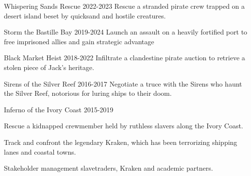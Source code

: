 \begin{cventries}
\cventry
{Whispering Sands Rescue} %
{}{}
{2022-2023} %
{ %
Rescue a stranded pirate crew trapped on a desert island beset by quicksand and hostile creatures.
}

\cventry
{Storm the Bastille Bay} %
{}{}
{2019-2024} %
{ %
Launch an assault on a heavily fortified port to free imprisoned allies and gain strategic advantage
}

\cventry
{Black Market Heist} %
{}{}
{2018-2022} %
{ %
Infiltrate a clandestine pirate auction to retrieve a stolen piece of Jack’s heritage.
}

\cventry
{Sirens of the Silver Reef} %
{}{}
{2016-2017} %
{ %
Negotiate a truce with the Sirens who haunt the Silver Reef, notorious for luring ships to their doom.
}

\cventry
{Inferno of the Ivory Coast} %
{}{}
{2015-2019} %
{ %
\begin{cvitems}
    \item {Rescue a kidnapped crewmember held by ruthless slavers along the Ivory Coast.}
    \item {Track and confront the legendary Kraken, which has been terrorizing shipping lanes and coastal towns.} 
    \item {Stakeholder management slavetraders, Kraken and academic partners.}
\end{cvitems} 
}

\end{cventries}
